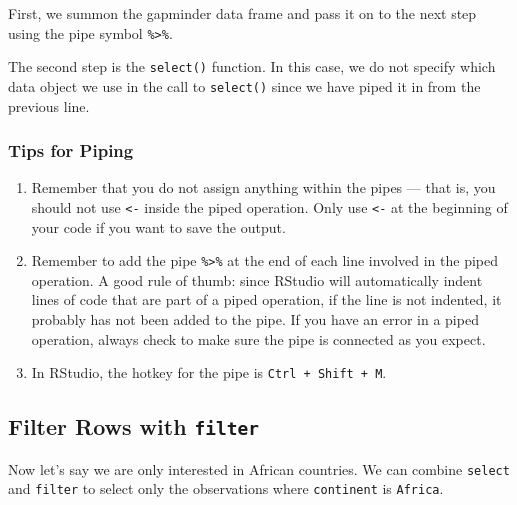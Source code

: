 \documentclass[]{book}
\newenvironment{Shaded}{\begin{snugshade}}{\end{snugshade}}
\newcommand{\KeywordTok}[1]{\textcolor[rgb]{0.13,0.29,0.53}{\textbf{#1}}}
\newcommand{\StringTok}[1]{\textcolor[rgb]{0.31,0.60,0.02}{#1}}
\newcommand{\OperatorTok}[1]{\textcolor[rgb]{0.81,0.36,0.00}{\textbf{#1}}}
\newcommand{\NormalTok}[1]{#1}
\begin{document}
First, we summon the gapminder data frame and pass it on to the next
step using the pipe symbol \texttt{\%\textgreater{}\%}.

The second step is the \texttt{select()} function. In this case, we do
not specify which data object we use in the call to \texttt{select()}
since we have piped it in from the previous line.

\subsubsection*{Tips for Piping}\label{tips-for-piping}

\begin{enumerate}
\def\labelenumi{\arabic{enumi}.}
\item
  Remember that you do not assign anything within the pipes --- that is,
  you should not use \texttt{\textless{}-} inside the piped operation.
  Only use \texttt{\textless{}-} at the beginning of your code if you
  want to save the output.
\item
  Remember to add the pipe \texttt{\%\textgreater{}\%} at the end of
  each line involved in the piped operation. A good rule of thumb: since
  RStudio will automatically indent lines of code that are part of a
  piped operation, if the line is not indented, it probably has not been
  added to the pipe. If you have an error in a piped operation, always
  check to make sure the pipe is connected as you expect.
\item
  In RStudio, the hotkey for the pipe is \texttt{Ctrl\ +\ Shift\ +\ M}.
\end{enumerate}

\subsection{\texorpdfstring{Filter Rows with
\texttt{filter}}{Filter Rows with filter}}\label{filter-rows-with-filter}

Now let's say we are only interested in African countries. We can
combine \texttt{select} and \texttt{filter} to select only the
observations where \texttt{continent} is \texttt{Africa}.

\begin{Shaded}
\end{Shaded}
\end{document}
